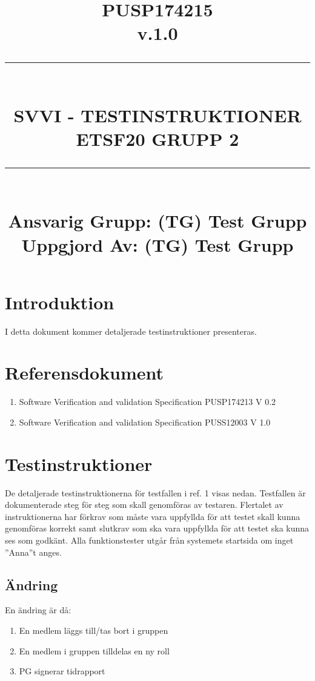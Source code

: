 \documentclass[paper=a4, fontsize=11pt,twoside]{article}
\title{
		\documentNumber{#1}																						
		\documentVersion{#2}																				
		\HRule{0.5pt} \\ %
		\LARGE \textbf{\uppercase{#3}} \\
		\large \textbf{\uppercase{ETSF20 Grupp 2}} 
		\HRule{2pt} \\ [1.5cm]    
		\normalsize            
		\documentResponsible{#4} \\ 
		\documentCreator{#4}  
	}
\newcommand{\HRule}[1]{\rule{\linewidth}{#1}}
\newcommand{\documentNumber}[1]{\centering PUSP1742#1 \\[1.0cm]}
\newcommand{\documentVersion}[1]{\centering \small{v.#1} \\[1.0cm]}
\newcommand{\documentResponsible}[1]{\centering  Ansvarig Grupp: #1}
\newcommand{\documentCreator}[1]{\centering Uppgjord Av: #1}
\newcommand{\grouptitlepage}[4]{ 
	\title{
		\documentNumber{#1}																						
		\documentVersion{#2}																				
		\HRule{0.5pt} \\ %
		\LARGE \textbf{\uppercase{#3}} \\
		\large \textbf{\uppercase{ETSF20 Grupp 2}} 
		\HRule{2pt} \\ [1.5cm]    
		\normalsize            
		\documentResponsible{#4} \\ 
		\documentCreator{#4}  
	}																							
	\maketitle																							
	\thispagestyle{empty} 																					
	\newpage 
}
\begin{document}
\grouptitlepage
{15}
{1.0}
{SVVI - Testinstruktioner}
{(TG) Test Grupp}
\tableofcontents
\section{Introduktion}

I detta dokument kommer detaljerade testinstruktioner presenteras.

\section{Referensdokument}

\begin{enumerate}
\item Software Verification and validation Specification PUSP174213 V 0.2
\item Software Verification and validation Specification PUSS12003 V 1.0
\end{enumerate}

\section{Testinstruktioner}

De detaljerade testinstruktionerna för testfallen i ref. 1 visas nedan.
Testfallen är dokumenterade steg för steg som skall genomföras av testaren. 
Flertalet av instruktionerna har förkrav som måste vara uppfyllda för att testet
skall kunna genomföras korrekt samt slutkrav som ska vara uppfyllda för att
testet ska kunna ses som godkänt. Alla funktionstester utgår från systemets
startsida om inget ”Anna”t anges.



 \subsection {Ändring}
En ändring är då:

\begin{enumerate}
  \item En medlem läggs till/tas bort i gruppen
  \item      En medlem i gruppen tilldelas en ny roll
  \item      PG signerar tidrapport
\end{enumerate}
\end{document}
